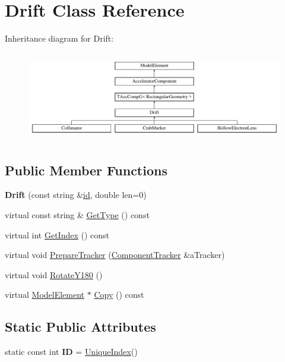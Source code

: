 \hypertarget{classDrift}{}\section{Drift Class Reference}
\label{classDrift}
Inheritance diagram for Drift\+:\begin{figure}[H]
\begin{center}
\leavevmode
\includegraphics[height=3.938116cm]{classDrift}
\end{center}
\end{figure}
\subsection*{Public Member Functions}
\begin{DoxyCompactItemize}
\item 
\mbox{\label{classDrift_a145d09c5783fcb458e9ee2269907fa5c}} 
{\bfseries Drift} (const string \&\hyperlink{classModelElement_aada171ead2085c75b592cf07d91bc5c2}{id}, double len=0)
\item 
virtual const string \& \hyperlink{classDrift_a9f5e7d0aafd8689a4420b3d5e7b6879e}{Get\+Type} () const
\item 
virtual int \hyperlink{classDrift_a19bc19d48348912f8693e3ebbf9e92f2}{Get\+Index} () const
\item 
virtual void \hyperlink{classDrift_a9f3925549a0c7c99b39a1abea8546642}{Prepare\+Tracker} (\hyperlink{classComponentTracker}{Component\+Tracker} \&a\+Tracker)
\item 
virtual void \hyperlink{classDrift_abf387eddfcabfc81b186080f6301ce60}{Rotate\+Y180} ()
\item 
virtual \hyperlink{classModelElement}{Model\+Element} $\ast$ \hyperlink{classDrift_ae47df31297596e13944364d602c95ce5}{Copy} () const
\end{DoxyCompactItemize}
\subsection*{Static Public Attributes}
\begin{DoxyCompactItemize}
\item 
\mbox{\label{classDrift_a885256e2c87bf0efc79b1295fd560a77}} 
static const int {\bfseries ID} = \hyperlink{classAcceleratorComponent_aa7ad4d39e1a488b705983842ed1ac784}{Unique\+Index}()
\end{DoxyCompactItemize}

